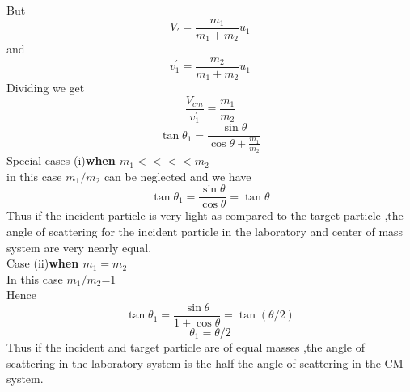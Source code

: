  But $$V_{\prime}=\frac{m_1}{m_1+m_2}u_1$$
 and $$v_1^{\prime}=\frac{m_2}{m_1+m_2}u_1$$
 Dividing we get $$\frac{V_{cm}}{v_1^{\prime}}=\frac{m_1}{m_2}$$
 $$\tan\theta_1=\frac{\sin\theta}{\cos\theta+\frac{m_1}{m_2}}$$
 Special cases (i)\textbf{when $m_1<<<<m_2$}\\
 in this case $m_1/m_2$ can be neglected and we have 
 $$\tan\theta_{1}=\frac{\sin \theta}{\cos\theta}=\tan\theta$$
 Thus if the incident particle is very light as compared to the target particle ,the angle of scattering for the incident particle in the laboratory and center of mass system are very nearly equal.\\
 Case (ii)\textbf{when $m_1=m_2$}\\
 In this case $m_1/m_2$=1\\
 Hence $$\tan\theta_{1}=\frac{\sin\theta}{1+\cos \theta}=\tan(\theta/2)$$
 $$\theta_{1}=\theta/2$$
 Thus if the incident and target particle are of equal masses ,the angle of scattering in the laboratory system is the half the angle of scattering in the CM system.
 
 
 
 
 
 
 
 
 
 
 
 
 
 
 
 
 
 
 
 
 
 
 
 
 
 
 
 
 

